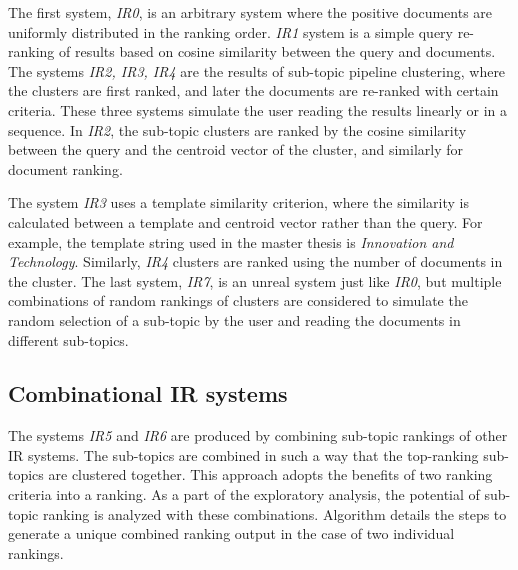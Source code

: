 The first system, \emph{IR0}, is an arbitrary system where the positive documents are uniformly distributed in the ranking order. \emph{IR1} system is a simple query re-ranking of results based on cosine similarity between the query and documents. The systems \emph{IR2, IR3, IR4} are the results of sub-topic pipeline clustering, where the clusters are first ranked, and later the documents are re-ranked with certain criteria. These three systems simulate the user reading the results linearly or in a sequence. In \emph{IR2}, the sub-topic clusters are ranked by the cosine similarity between the query and the centroid vector of the cluster, and similarly for document ranking.


The system \emph{IR3} uses a template similarity criterion, where the similarity is calculated between a template and centroid vector rather than the query. For example, the template string used in the master thesis is \emph{Innovation and Technology}. Similarly, \emph{IR4} clusters are ranked using the number of documents in the cluster. The last system, \emph{IR7}, is an unreal system just like \emph{IR0}, but multiple combinations of random rankings of clusters are considered to simulate the random selection of a sub-topic by the user and reading the documents in different sub-topics.


\subsection{Combinational IR systems}

The systems \emph{IR5} and \emph{IR6} are produced by combining sub-topic rankings of other \ac{IR} systems. The sub-topics are combined in such a way that the top-ranking sub-topics are clustered together. This approach adopts the benefits of two ranking criteria into a ranking. As a part of the exploratory analysis, the potential of sub-topic ranking is analyzed with these combinations. Algorithm  details the steps to generate a unique combined ranking output in the case of two individual rankings.


